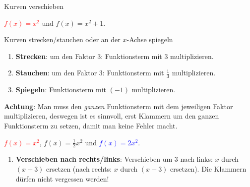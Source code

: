 \begin{bla}{Kurven verschieben}
\begin{marginfigure}
  \caption{\textcolor{red}{$f(x)=x^2$} und \textcolor{black!60!green}{$f(x)=x^2+1$}.}
\end{marginfigure}

\begin{bla}{Kurven strecken/stauchen oder an der $x$-Achse spiegeln}
  \begin{enumerate}
    \item \textbf{Strecken}: um den Faktor 3: Funktionsterm mit $3$ multiplizieren.
    \item \textbf{Stauchen}: um den Faktor 3: Funktionsterm mit $\tfrac{1}{3}$ multiplizieren.
    \item \textbf{Spiegeln}: Funktionsterm mit $(-1)$ multiplizieren.
  \end{enumerate}
  \textbf{Achtung}: Man muss den \emph{ganzen} Funktionsterm mit dem jeweiligen Faktor multiplizieren, deswegen ist es sinnvoll, erst Klammern um den ganzen Funktionsterm zu setzen, damit man keine Fehler macht.
\end{bla}

\begin{marginfigure}
  \caption{\textcolor{red}{$f(x)=x^2$}, \textcolor{black!60!green}{$f(x)=\frac{1}{2} x^2$} und \textcolor{blue}{$f(x)=2x^2$}.}
\end{marginfigure}
  \begin{enumerate}
    \item \textbf{Verschieben nach rechts/links}: Verschieben um $3$ nach links: $x$ durch $(x+3)$ ersetzen (nach rechts: $x$ durch $(x-3)$ ersetzen). Die Klammern dürfen nicht vergessen werden!


\end{enumerate}
\end{bla}
